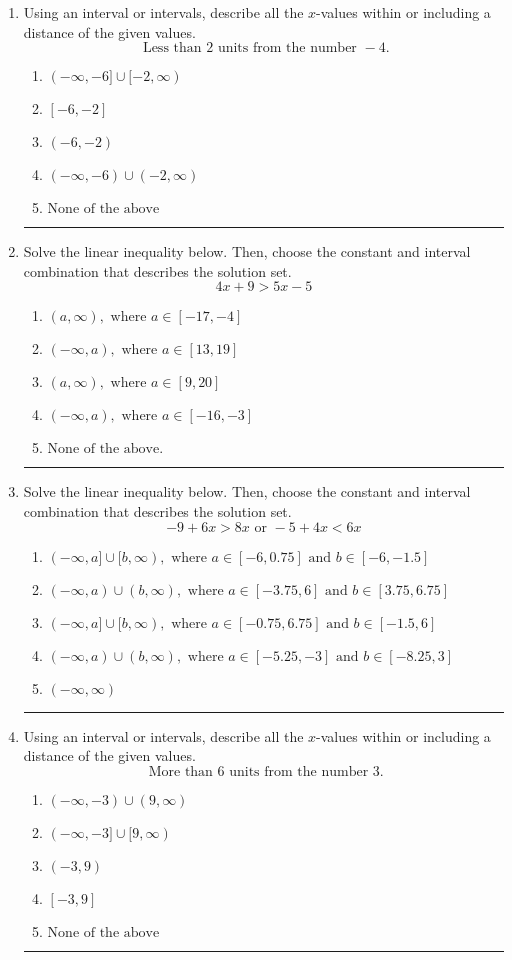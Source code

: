 \documentclass[14pt]{extbook}
\newcommand{\litem}[1]{\item#1\hspace*{-1cm}\rule{\textwidth}{0.4pt}}
\begin{document}
\begin{enumerate}
{\begin{enumerate}[label=\Alph*.]
\end{enumerate} }
\litem{
Using an interval or intervals, describe all the $x$-values within or including a distance of the given values.\[ \text{ Less than } 2 \text{ units from the number } -4. \]\begin{enumerate}[label=\Alph*.]
\item \( (-\infty, -6] \cup [-2, \infty) \)
\item \( [-6, -2] \)
\item \( (-6, -2) \)
\item \( (-\infty, -6) \cup (-2, \infty) \)
\item \( \text{None of the above} \)

\end{enumerate} }
\litem{
Solve the linear inequality below. Then, choose the constant and interval combination that describes the solution set.\[ 4x + 9 > 5x -5 \]\begin{enumerate}[label=\Alph*.]
\item \( (a, \infty), \text{ where } a \in [-17, -4] \)
\item \( (-\infty, a), \text{ where } a \in [13, 19] \)
\item \( (a, \infty), \text{ where } a \in [9, 20] \)
\item \( (-\infty, a), \text{ where } a \in [-16, -3] \)
\item \( \text{None of the above}. \)

\end{enumerate} }
\litem{
Solve the linear inequality below. Then, choose the constant and interval combination that describes the solution set.\[ -9 + 6 x > 8 x \text{ or } -5 + 4 x < 6 x \]\begin{enumerate}[label=\Alph*.]
\item \( (-\infty, a] \cup [b, \infty), \text{ where } a \in [-6, 0.75] \text{ and } b \in [-6, -1.5] \)
\item \( (-\infty, a) \cup (b, \infty), \text{ where } a \in [-3.75, 6] \text{ and } b \in [3.75, 6.75] \)
\item \( (-\infty, a] \cup [b, \infty), \text{ where } a \in [-0.75, 6.75] \text{ and } b \in [-1.5, 6] \)
\item \( (-\infty, a) \cup (b, \infty), \text{ where } a \in [-5.25, -3] \text{ and } b \in [-8.25, 3] \)
\item \( (-\infty, \infty) \)

\end{enumerate} }
\litem{
Using an interval or intervals, describe all the $x$-values within or including a distance of the given values.\[ \text{ More than } 6 \text{ units from the number } 3. \]\begin{enumerate}[label=\Alph*.]
\item \( (-\infty, -3) \cup (9, \infty) \)
\item \( (-\infty, -3] \cup [9, \infty) \)
\item \( (-3, 9) \)
\item \( [-3, 9] \)
\item \( \text{None of the above} \)


\end{enumerate}}
\end{enumerate}
\end{document}

